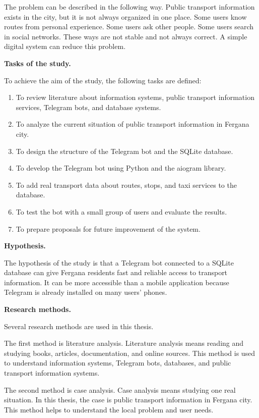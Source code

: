 The problem can be described in the following way. Public transport information exists in the city, but it is not always organized in one place. Some users know routes from personal experience. Some users ask other people. Some users search in social networks. These ways are not stable and not always correct. A simple digital system can reduce this problem.

\textbf{Tasks of the study.}

To achieve the aim of the study, the following tasks are defined:

\begin{enumerate}
    \item To review literature about information systems, public transport information services, Telegram bots, and database systems.
    \item To analyze the current situation of public transport information in Fergana city.
    \item To design the structure of the Telegram bot and the SQLite database.
    \item To develop the Telegram bot using Python and the aiogram library.
    \item To add real transport data about routes, stops, and taxi services to the database.
    \item To test the bot with a small group of users and evaluate the results.
    \item To prepare proposals for future improvement of the system.
\end{enumerate}

\textbf{Hypothesis.}

The hypothesis of the study is that a Telegram bot connected to a SQLite database can give Fergana residents fast and reliable access to transport information. It can be more accessible than a mobile application because Telegram is already installed on many users' phones.

\textbf{Research methods.}

Several research methods are used in this thesis.

The first method is literature analysis. Literature analysis means reading and studying books, articles, documentation, and online sources. This method is used to understand information systems, Telegram bots, databases, and public transport information systems.

The second method is case analysis. Case analysis means studying one real situation. In this thesis, the case is public transport information in Fergana city. This method helps to understand the local problem and user needs.

